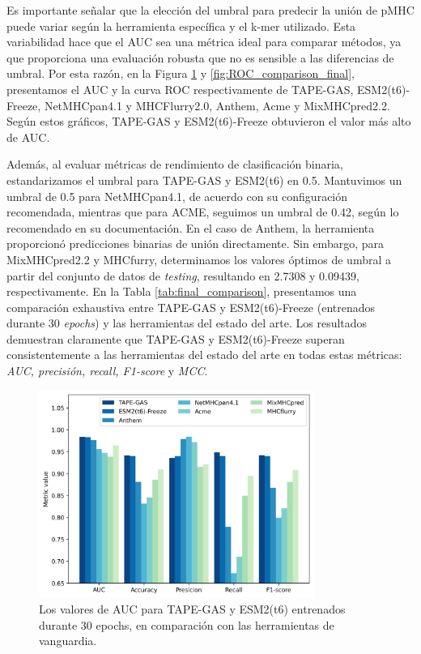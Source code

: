 Es importante señalar que la elección del umbral para predecir la unión de pMHC puede variar según la herramienta específica y el k-mer utilizado. Esta variabilidad hace que el AUC sea una métrica ideal para comparar métodos, ya que proporciona una evaluación robusta que no es sensible a las diferencias de umbral. Por esta razón, en la Figura \ref{fig:comparison_final} y \ref{fig:ROC_comparison_final}, presentamos el AUC y la curva ROC respectivamente de TAPE-GAS, ESM2(t6)-Freeze, NetMHCpan4.1 y MHCFlurry2.0, Anthem, Acme y MixMHCpred2.2. Según estos gráficos, TAPE-GAS y ESM2(t6)-Freeze obtuvieron el valor más alto de AUC.

Además, al evaluar métricas de rendimiento de clasificación binaria, estandarizamos el umbral para TAPE-GAS y ESM2(t6) en 0.5. Mantuvimos un umbral de 0.5 para NetMHCpan4.1, de acuerdo con su configuración recomendada, mientras que para ACME, seguimos un umbral de 0.42, según lo recomendado en su documentación. En el caso de Anthem, la herramienta proporcionó predicciones binarias de unión directamente. Sin embargo, para MixMHCpred2.2 y MHCfurry, determinamos los valores óptimos de umbral a partir del conjunto de datos de \textit{testing}, resultando en 2.7308 y 0.09439, respectivamente. En la Tabla \ref{tab:final_comparison}, presentamos una comparación exhaustiva entre TAPE-GAS y ESM2(t6)-Freeze (entrenados durante 30 \textit{epochs}) y las herramientas del estado del arte. Los resultados demuestran claramente que TAPE-GAS y ESM2(t6)-Freeze superan consistentemente a las herramientas del estado del arte en todas estas métricas: \textit{AUC, precisión, recall, F1-score} y \textit{MCC}.

\begin{figure}
	\centering
	\includegraphics[width=0.8\textwidth]{img/results/metrics_comparison}
	\caption[Comparación del AUC con métodos del estado del arte]{Los valores de AUC para TAPE-GAS y ESM2(t6) entrenados durante 30 epochs, en comparación con las herramientas de vanguardia.}
	\label{fig:comparison_final}
\end{figure}

